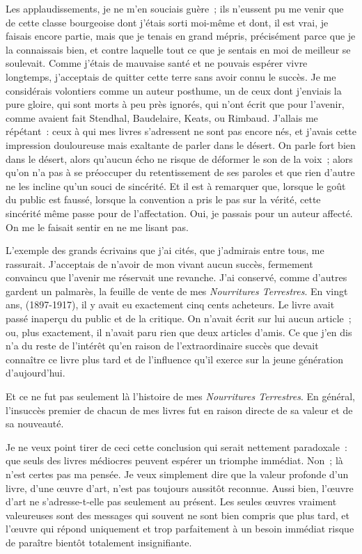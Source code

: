 \documentclass[twoside]{book} %
\begin{document}
Les applaudissements, je ne m’en souciais guère ; ils n’eussent pu me venir que de cette classe bourgeoise dont j’étais sorti moi-même et dont, il est vrai, je faisais encore partie, mais que je tenais en grand mépris, précisément parce que je la connaissais bien, et contre laquelle tout ce que je sentais en moi de meilleur se soulevait. Comme j’étais de mauvaise santé et ne pouvais espérer vivre longtemps, j’acceptais de quitter cette terre sans avoir connu le succès. Je me considérais volontiers comme un auteur posthume, un de ceux dont j’enviais la pure gloire, qui sont morts à peu près ignorés, qui n’ont écrit que pour l’avenir, comme avaient fait Stendhal, Baudelaire, Keats, ou Rimbaud. J’allais me répétant : ceux à qui mes livres s’adressent ne sont pas encore nés, et j’avais cette impression douloureuse mais exaltante de parler dans le désert. On parle fort bien dans le désert, alors qu’aucun écho ne risque de déformer le son de la voix ; alors qu’on n’a pas à se préoccuper du retentissement de ses paroles et que rien d’autre ne les incline qu’un souci de sincérité. Et il est à remarquer que, lorsque le goût du public est faussé, lorsque la convention a pris le pas sur la vérité, cette sincérité même passe pour de l’affectation. Oui, je passais pour un auteur affecté. On me le faisait sentir en ne me lisant pas.\par
L’exemple des grands écrivains que j’ai cités, que j’admirais entre tous, me rassurait. J’acceptais de n’avoir de mon vivant aucun succès, fermement convaincu que l’avenir me réservait une revanche. J’ai conservé, comme d’autres gardent un palmarès, la feuille de vente de mes \emph{Nourritures Terrestres}. En vingt ans, (1897-1917), il y avait eu exactement cinq cents acheteurs. Le livre avait passé inaperçu du public et de la critique. On n’avait écrit sur lui aucun article ; ou, plus exactement, il n’avait paru rien que deux articles d’amis. Ce que j’en dis n’a du reste de l’intérêt qu’en raison de l’extraordinaire succès que devait connaître ce livre plus tard et de l’influence qu’il exerce sur la jeune génération d’aujourd’hui.\par
Et ce ne fut pas seulement là l’histoire de mes \emph{Nourritures Terrestres}. En général, l’insuccès premier de chacun de mes livres fut en raison directe de sa valeur et de sa nouveauté.\par
Je ne veux point tirer de ceci cette conclusion qui serait nettement paradoxale : que seuls des livres médiocres peuvent espérer un triomphe immédiat. Non ; là n’est certes pas ma pensée. Je veux simplement dire que la valeur profonde d’un livre, d’une œuvre d’art, n’est pas toujours aussitôt reconnue. Aussi bien, l’œuvre d’art ne s’adresse-t-elle pas seulement au présent. Les seules œuvres vraiment valeureuses sont des messages qui souvent ne sont bien compris que plus tard, et l’œuvre qui répond uniquement et trop parfaitement à un besoin immédiat risque de paraître bientôt totalement insignifiante.\par
\end{document}
